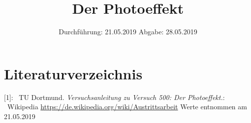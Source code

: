 

\subject{Nr.500}
\title{Der Photoeffekt}
\date{%
  Durchführung: 21.05.2019
  \hspace{3em}
  Abgabe: 28.05.2019
}



\maketitle
\thispagestyle{empty}
\tableofcontents
\newpage







\section{Literaturverzeichnis}

[1]: \ TU Dortmund. \textit{Versuchsanleitung zu Versuch 500:
Der Photoeffekt.}\newline
[2]: \ Wikipedia \url{https://de.wikipedia.org/wiki/Austrittsarbeit}\newline
Werte entnommen am 21.05.2019

\printbibliography{}


